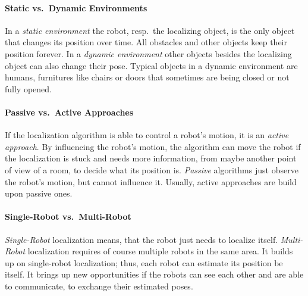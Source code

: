 \paragraph{Static vs.\ Dynamic Environments} In a \emph{static environment} the robot, resp.\ the localizing object, is the only object that changes its position over time. All obstacles and other objects keep their position forever. In a \emph{dynamic environment} other objects besides the localizing object can also change their pose. Typical objects in a dynamic environment are humans, furnitures like chairs or doors that sometimes are being closed or not fully opened.

\paragraph{Passive vs.\ Active Approaches} If the localization algorithm is able to control a robot's motion, it is an \emph{active approach}. By influencing the robot's motion, the algorithm can move the robot if the localization is stuck and needs more information, from maybe another point of view of a room, to decide what its position is. \emph{Passive} algorithms just observe the robot's motion, but cannot influence it. Usually, active approaches are build upon passive ones.

\paragraph{Single-Robot vs.\ Multi-Robot} \emph{Single-Robot} localization means, that the robot just needs to localize itself. \emph{Multi-Robot} localization requires of course multiple robots in the same area. It builds up on single-robot localization; thus, each robot can estimate its position be itself. It brings up new opportunities if the robots can see each other and are able to communicate, to exchange their estimated poses.


